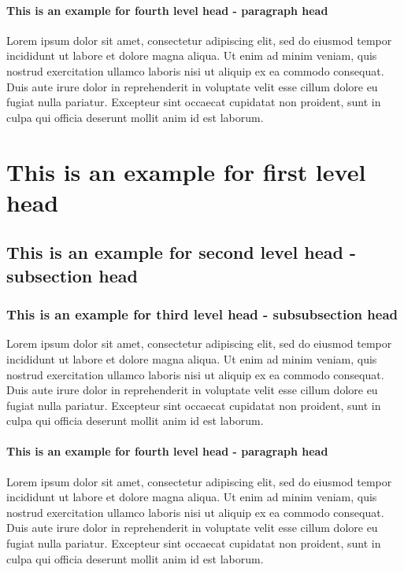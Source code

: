 \documentclass[unnumsec,webpdf,modern,large]{mam-authoring-template}%
\theoremstyle{thmstyleone}%
\theoremstyle{thmstyletwo}%
\theoremstyle{thmstylethree}%
\begin{document}
\paragraph{This is an example for fourth level head - paragraph head}

Lorem ipsum dolor sit amet, consectetur adipiscing elit, sed do eiusmod tempor incididunt ut labore et dolore magna aliqua. Ut enim ad minim veniam, quis nostrud exercitation ullamco laboris nisi ut aliquip ex ea commodo consequat. Duis aute irure dolor in reprehenderit in voluptate velit esse cillum dolore eu fugiat nulla pariatur. Excepteur sint occaecat cupidatat non proident, sunt in culpa qui officia deserunt mollit anim id est laborum.

\section{This is an example for first level head}\label{sec3}

\subsection{This is an example for second level head - subsection head}\label{subsec2}

\subsubsection{This is an example for third level head - subsubsection head}\label{subsubsec2}

Lorem ipsum dolor sit amet, consectetur adipiscing elit, sed do eiusmod tempor incididunt ut labore et dolore magna aliqua. Ut enim ad minim veniam, quis nostrud exercitation ullamco laboris nisi ut aliquip ex ea commodo consequat. Duis aute irure dolor in reprehenderit in voluptate velit esse cillum dolore eu fugiat nulla pariatur. Excepteur sint occaecat cupidatat non proident, sunt in culpa qui officia deserunt mollit anim id est laborum.

\paragraph{This is an example for fourth level head - paragraph head}

Lorem ipsum dolor sit amet, consectetur adipiscing elit, sed do eiusmod tempor incididunt ut labore et dolore magna aliqua. Ut enim ad minim veniam, quis nostrud exercitation ullamco laboris nisi ut aliquip ex ea commodo consequat. Duis aute irure dolor in reprehenderit in voluptate velit esse cillum dolore eu fugiat nulla pariatur. Excepteur sint occaecat cupidatat non proident, sunt in culpa qui officia deserunt mollit anim id est laborum.
\end{document}
